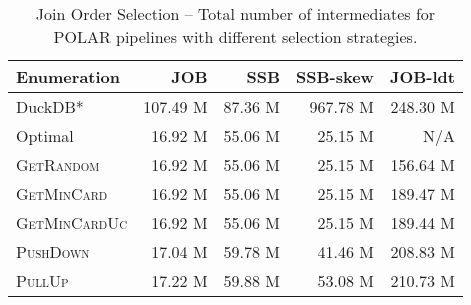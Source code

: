 \begin{table}[!t]
  \centering
  \caption{Join Order Selection -- Total number of intermediates for POLAR pipelines with different selection strategies.}
  \vspace{-0.3cm}  \setlength\tabcolsep{3.5pt}
  \begin{tabular}{lrrrr}
    \toprule
    \textbf{Enumeration} & \textbf{JOB} & \textbf{SSB} & \textbf{SSB-skew} & \textbf{JOB-ldt}\\
    \midrule
    DuckDB* &     107.49 M &      87.36 M &     967.78 M &     248.30 M\\
    Optimal &      16.92 M &      55.06 M &      25.15 M & N/A\\
    \midrule
    \textsc{GetRandom} &      16.92 M &      55.06 M &      25.15 M &     156.64 M\\
    \textsc{GetMinCard} &      16.92 M &      55.06 M &      25.15 M &     189.47 M\\
    \textsc{GetMinCardUc} &      16.92 M &      55.06 M &      25.15 M &     189.44 M\\
    \textsc{PushDown} &      17.04 M &      59.78 M &      41.46 M &     208.83 M\\
    \textsc{PullUp} &      17.22 M &      59.88 M &      53.08 M &     210.73 M\\
    \bottomrule
  \end{tabular}
  \label{tab:1_1_sel_intms}
\end{table}
